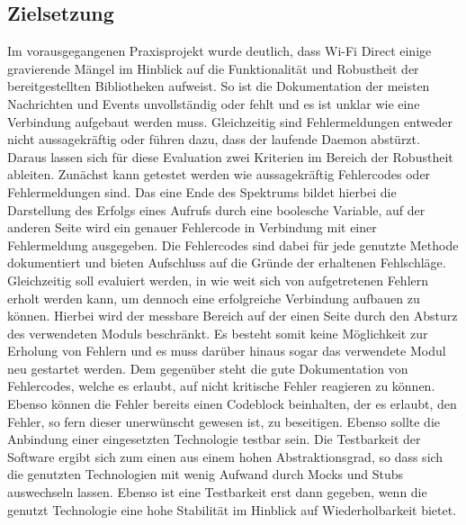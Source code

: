         \subsection{Zielsetzung}
        Im vorausgegangenen Praxisprojekt wurde deutlich, dass Wi-Fi Direct einige \linebreak gravierende Mängel im Hinblick auf die Funktionalität und Robustheit der bereitgestellten Bibliotheken aufweist. So ist die Dokumentation der meisten Nachrichten und Events unvollständig oder fehlt und es ist unklar wie eine Verbindung aufgebaut werden muss. Gleichzeitig sind Fehlermeldungen entweder nicht aussagekräftig oder führen dazu, dass der laufende Daemon abstürzt.
        Daraus lassen sich für diese Evaluation zwei Kriterien im Bereich der Robustheit ableiten.
        Zunächst kann getestet werden wie aussagekräftig Fehlercodes oder Fehlermeldungen sind.
        Das eine Ende des Spektrums bildet hierbei die Darstellung des Erfolgs eines Aufrufs durch eine boolesche Variable, auf der anderen Seite wird ein genauer Fehlercode in Verbindung mit einer Fehlermeldung ausgegeben. Die Fehlercodes sind dabei für jede genutzte Methode dokumentiert und bieten Aufschluss auf die Gründe der erhaltenen Fehlschläge. 
        Gleichzeitig soll evaluiert werden, in wie weit sich von aufgetretenen Fehlern erholt werden kann, um dennoch eine erfolgreiche Verbindung aufbauen zu können. Hierbei wird der messbare Bereich auf der einen Seite durch den Absturz des verwendeten Moduls beschränkt. Es besteht somit keine Möglichkeit zur Erholung von Fehlern und es muss darüber hinaus sogar das verwendete Modul neu gestartet werden. Dem gegenüber steht die gute Dokumentation von Fehlercodes, welche es erlaubt, auf nicht kritische Fehler reagieren zu können. Ebenso können die Fehler bereits einen Codeblock beinhalten, der es erlaubt, den Fehler, so fern dieser unerwünscht gewesen ist, zu beseitigen.
        Ebenso sollte die Anbindung einer eingesetzten Technologie testbar sein. Die Testbarkeit der Software ergibt sich zum einen aus einem hohen Abstraktionsgrad, so dass sich die genutzten Technologien mit wenig Aufwand durch Mocks und Stubs auswechseln lassen. Ebenso ist eine Testbarkeit erst dann gegeben, wenn die genutzt Technologie eine hohe Stabilität im Hinblick auf Wiederholbarkeit bietet.
        
